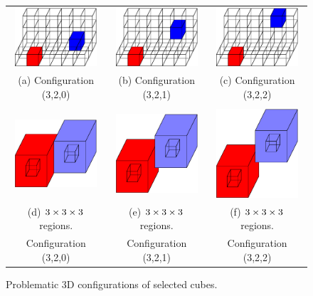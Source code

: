 \begin{figure}[t]
\centering

\begin{tabular}{ccc}
\includegraphics[width=1.2in]{images/config3D_3_2_0.eps} \qquad &
\qquad
\includegraphics[width=1.2in]{images/config3D_3_2_1.eps}
\qquad &
\qquad
\includegraphics[width=1.2in]{images/config3D_3_2_2.eps} \\
(a) Configuration (3,2,0) & (b) Configuration (3,2,1) 
  & (c) Configuration (3,2,2) \\
\\
\includegraphics[width=1.2in]{images/config3D_3_2_0_3x3x3.eps} \qquad &
\qquad
\includegraphics[width=1.2in]{images/config3D_3_2_1_3x3x3.eps}
\qquad &
\qquad
\includegraphics[width=1.2in]{images/config3D_3_2_2_3x3x3.eps} \\
(d) $3 \times 3 \times 3$ regions. & (e) $3 \times 3 \times 3$ regions.
  & (f) $3 \times 3 \times 3$ regions.\\
Configuration (3,2,0) & Configuration (3,2,1) 
  & Configuration (3,2,2)
\end{tabular}
\caption{Problematic 3D configurations of selected cubes.}
\label{fig:loose3D}
\end{figure}


